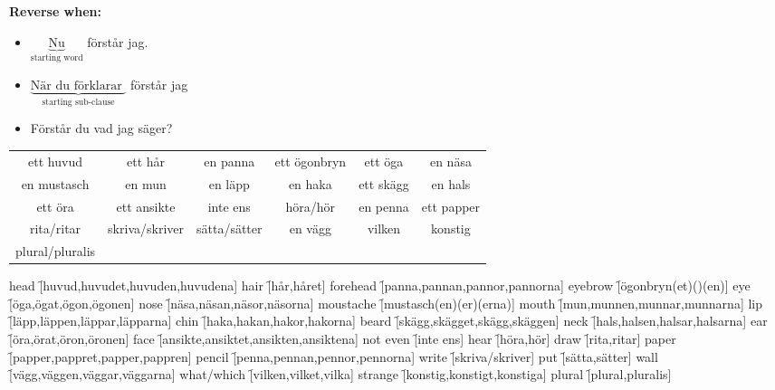 
\begin{flushleft}
    \textbf{Reverse when:}
    \begin{itemize}
        \item $\underbrace{\text{Nu}}_{\text{starting word}}$ förstår jag.
        \item $\underbrace{\text{När du förklarar }}_{\text{starting sub-clause}}$ förstår jag
        \item Förstår du vad jag säger?
    \end{itemize}
\end{flushleft}

\begin{center}
    \begin{tabular}{|c c c c c c|}
        \hline
        ett huvud & ett hår & en panna & ett ögonbryn & ett öga & en näsa \\
        en mustasch & en mun & en läpp & en haka & ett skägg & en hals \\
        ett öra & ett ansikte & inte ens & höra/hör & en penna & ett papper  \\
        rita/ritar & skriva/skriver & sätta/sätter & en vägg & vilken & konstig \\
        plural/pluralis &  &  &  &  &  \\
        \hline
    \end{tabular}
\end{center}

\begin{questions}
    \begin{multicols}{2}
        \raggedcolumns
        \question head \f[huvud,huvudet,huvuden,huvudena]
        \question hair \f[hår,håret]
        \question forehead \f[panna,pannan,pannor,pannorna]
        \question eyebrow \f[ögonbryn(et)()(en)]
        \question eye \f[öga,ögat,ögon,ögonen]
        \question nose \f[näsa,näsan,näsor,näsorna]
        \question moustache \f[mustasch(en)(er)(erna)]
        \question mouth \f[mun,munnen,munnar,munnarna]
        \question lip \f[läpp,läppen,läppar,läpparna]
        \question chin \f[haka,hakan,hakor,hakorna]
        \question beard \f[skägg,skägget,skägg,skäggen]
        \question neck \f[hals,halsen,halsar,halsarna]
        \question ear \f[öra,örat,öron,öronen]
        \question face \f[ansikte,ansiktet,ansikten,ansiktena]
        \question not even \f[inte ens]
        \question hear \f[höra,hör]
        \question draw \f[rita,ritar]
        \question paper \f[papper,pappret,papper,pappren]
        \question pencil \f[penna,pennan,pennor,pennorna]
        \question write \f[skriva/skriver]
        \question put \f[sätta,sätter]
        \question wall \f[vägg,väggen,väggar,väggarna]
        \question what/which \f[vilken,vilket,vilka]
        \question strange \f[konstig,konstigt,konstiga]
        \question plural \f[plural,pluralis]
    \end{multicols}
\end{questions}
